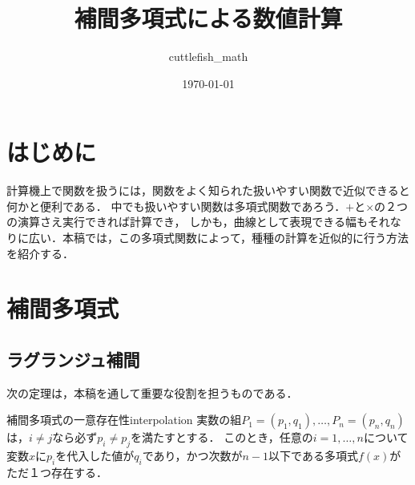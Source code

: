 \documentclass[a4paper]{ltjsarticle}
\title{補間多項式による数値計算}
\author{cuttlefish\_math}
\date{\today}
\theoremstyle{definition}
\begin{document}
\maketitle
\tableofcontents

\section{はじめに}
計算機上で関数を扱うには，関数をよく知られた扱いやすい関数で近似できると何かと便利である．
中でも扱いやすい関数は多項式関数であろう．$+$と$\times$の２つの演算さえ実行できれば計算でき，
しかも，曲線として表現できる幅もそれなりに広い．本稿では，この多項式関数によって，種種の計算を近似的に行う方法を紹介する．

\section{補間多項式}
\subsection{ラグランジュ補間}
次の定理は，本稿を通して重要な役割を担うものである．

\begin{theorem}{補間多項式の一意存在性}{interpolation}
  実数の組$P_1 = (p_1, q_1), \dots, P_n = (p_n, q_n)$は，$i \neq j$なら必ず$p_i \neq p_j$を満たすとする．
  このとき，任意の$i = 1,\dots,n$について変数$x$に$p_i$を代入した値が$q_i$であり，かつ次数が$n-1$以下である多項式$f(x)$がただ１つ存在する．
\end{theorem}
\end{document}
